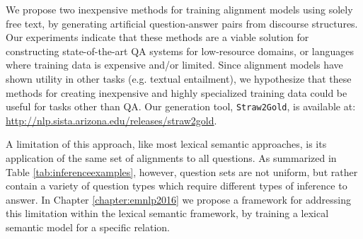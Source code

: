 We propose two inexpensive methods for training alignment models using solely free text, by generating artificial question-answer pairs from discourse structures. 
Our experiments indicate that these methods are a viable solution for constructing state-of-the-art QA systems for low-resource domains, or languages where training data is expensive and/or limited.  Since alignment models have shown utility in other tasks (e.g. textual entailment), we hypothesize that these methods for creating inexpensive and highly specialized training data could be useful for tasks other than QA.  
Our generation tool, {\tt Straw2Gold}, is available at: {\small \url{http://nlp.sista.arizona.edu/releases/straw2gold}}.

A limitation of this approach, like most lexical semantic approaches, is its application of the same set of alignments to all questions.  As summarized in Table \ref{tab:inferenceexamples}, however, question sets are not uniform, but rather contain a variety of question types which require different types of inference to answer.  In Chapter \ref{chapter:emnlp2016} we propose a framework for addressing this limitation within the lexical semantic framework, by training a lexical semantic model for a specific relation. 




